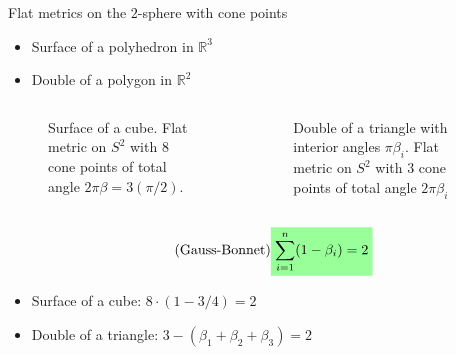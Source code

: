 \documentclass{beamer}
\newcommand{\R}{\mathbb{R}}
\newcommand{\mathcolorbox}[2]{\colorbox{#1}{$\displaystyle #2$}}
\begin{document}
\begin{frame}{Flat metrics on the \(2\)-sphere with cone points}
	\begin{itemize}
		\item Surface of a polyhedron in \(\R^3\)
		\item Double of a polygon in \(\R^2\)
	\end{itemize}

	\begin{columns}
	\begin{column}{.48\textwidth}
		\begin{figure}
			\caption{Surface of a cube. Flat metric on \(S^2\) with \(8\) cone points of total angle \(2\pi\beta=3(\pi/2)\).}
		\end{figure}
	\end{column}	
	\begin{column}{.48\textwidth}
		\begin{figure}
			\caption{Double of a triangle with interior angles \(\pi\beta_i\). Flat metric on \(S^2\) with \(3\) cone points of total angle \(2\pi\beta_i\)}
		\end{figure}
	\end{column}
\end{columns}

\begin{equation}\tag{Gauss-Bonnet}
	\mathcolorbox{green!40}{
		\sum_{i=1}^n (1-\beta_i) = 2
	}
\end{equation}

\begin{itemize}
	\item Surface of a cube: \(8 \cdot (1-3/4) = 2\) 
	\item Double of a triangle: \(3 - (\beta_1+\beta_2 + \beta_3) = 2\)
\end{itemize}

\end{frame}
\end{document}
